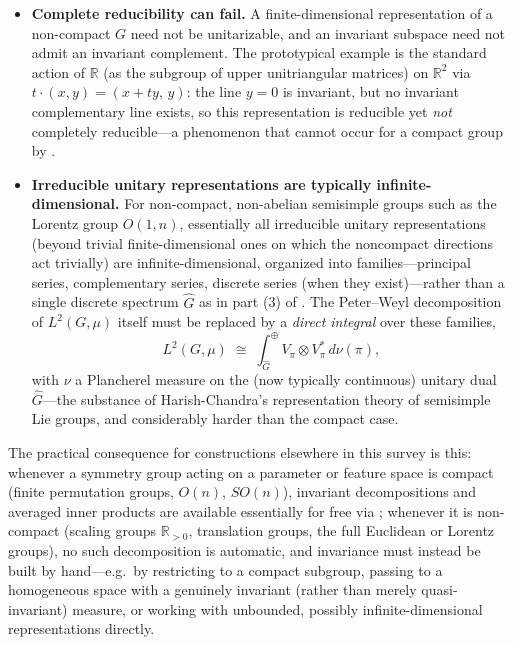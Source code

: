 \documentclass[11pt]{article}
\theoremstyle{plain}
\theoremstyle{definition}
\begin{document}
\begin{itemize}
    \item \textbf{Complete reducibility can fail.} A finite-dimensional
    representation of a non-compact $G$ need not be unitarizable, and an
    invariant subspace need not admit an invariant complement. The
    prototypical example is the standard action of $\mathbb{R}$ (as the
    subgroup of upper unitriangular matrices) on $\mathbb{R}^2$ via
    $t \cdot (x,y) = (x + ty,\, y)$: the line $y = 0$ is invariant, but no
    invariant complementary line exists, so this representation is
    reducible yet \emph{not} completely reducible---a phenomenon that
    cannot occur for a compact group by .
    \item \textbf{Irreducible unitary representations are typically
    infinite-dimensional.} For non-compact, non-abelian semisimple groups
    such as the Lorentz group $O(1,n)$, essentially all irreducible unitary
    representations (beyond trivial finite-dimensional ones on which the
    noncompact directions act trivially) are infinite-dimensional, organized
    into families---principal series, complementary series, discrete series
    (when they exist)---rather than a single discrete spectrum $\widehat{G}$
    as in part (3) of . The Peter--Weyl
    decomposition of $L^2(G,\mu)$ itself must be replaced by a
    \emph{direct integral} over these families,
    \[
        L^2(G,\mu) \;\cong\; \int_{\widehat{G}}^{\oplus} V_\pi \otimes V_\pi^* \, d\nu(\pi),
    \]
    with $\nu$ a Plancherel measure on the (now typically continuous)
    unitary dual $\widehat{G}$---the substance of Harish-Chandra's
    representation theory of semisimple Lie groups, and considerably harder
    than the compact case.
\end{itemize}

The practical consequence for constructions elsewhere in this survey is
this: whenever a symmetry group acting on a parameter or feature space is
compact (finite permutation groups, $O(n)$, $SO(n)$), invariant
decompositions and averaged inner products are available essentially for
free via ; whenever it is non-compact (scaling
groups $\mathbb{R}_{>0}$, translation groups, the full Euclidean or Lorentz
groups), no such decomposition is automatic, and invariance must instead be
built by hand---e.g.\ by restricting to a compact subgroup, passing to a
homogeneous space with a genuinely invariant (rather than merely
quasi-invariant) measure, or working with unbounded, possibly
infinite-dimensional representations directly.
\end{document}
